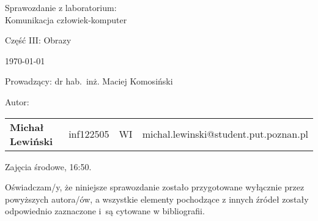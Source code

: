 \thispagestyle{empty} %

\begin{center}
{\large{Sprawozdanie z laboratorium:\\
Komunikacja człowiek-komputer\\
}}

\vspace{3ex}

Część III: Obrazy

\vspace{3ex}
{\footnotesize\today}

\end{center}


\vspace{10ex}

Prowadzący: dr hab.~inż. Maciej Komosiński

\vspace{5ex}

Autor:
\begin{tabular}{lllr}
\textbf{Michał Lewiński} & inf122505 & WI & michal.lewinski@student.put.poznan.pl \\
\end{tabular}

\vspace{5ex}

Zajęcia środowe, 16:50.

\vspace{35ex}

\noindent Oświadczam/y, że niniejsze sprawozdanie zostało przygotowane wyłącznie przez powyższych autora/ów,
a wszystkie elementy pochodzące z innych źródeł zostały odpowiednio zaznaczone i~są cytowane w bibliografii.

\newpage
